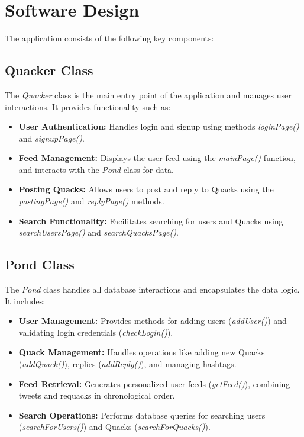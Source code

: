 \documentclass[11pt]{article}
\begin{document}
\section{Software Design}
The application consists of the following key components:

	\subsection*{Quacker Class}
	The \textit{Quacker} class is the main entry point of the application and manages user interactions. It provides functionality such as:
	\begin{itemize}
		\item \textbf{User Authentication:} Handles login and signup using methods \textit{loginPage()} and \textit{signupPage()}.
		\item \textbf{Feed Management:} Displays the user feed using the \textit{mainPage()} function, and interacts with the \textit{Pond} class for data.
		\item \textbf{Posting Quacks:} Allows users to post and reply to Quacks using the \textit{postingPage()} and \textit{replyPage()} methods.
		\item \textbf{Search Functionality:} Facilitates searching for users and Quacks using \textit{searchUsersPage()} and \textit{searchQuacksPage()}.
	\end{itemize}

	\subsection*{Pond Class}
	The \textit{Pond} class handles all database interactions and encapsulates the data logic. It includes:
	\begin{itemize}
		\item \textbf{User Management:} Provides methods for adding users (\textit{addUser()}) and validating login credentials (\textit{checkLogin()}).
		\item \textbf{Quack Management:} Handles operations like adding new Quacks (\textit{addQuack()}), replies (\textit{addReply()}), and managing hashtags.
		\item \textbf{Feed Retrieval:} Generates personalized user feeds (\textit{getFeed()}), combining tweets and requacks in chronological order.
		\item \textbf{Search Operations:} Performs database queries for searching users (\textit{searchForUsers()}) and Quacks (\textit{searchForQuacks()}).
	\end{itemize}
\end{document}
